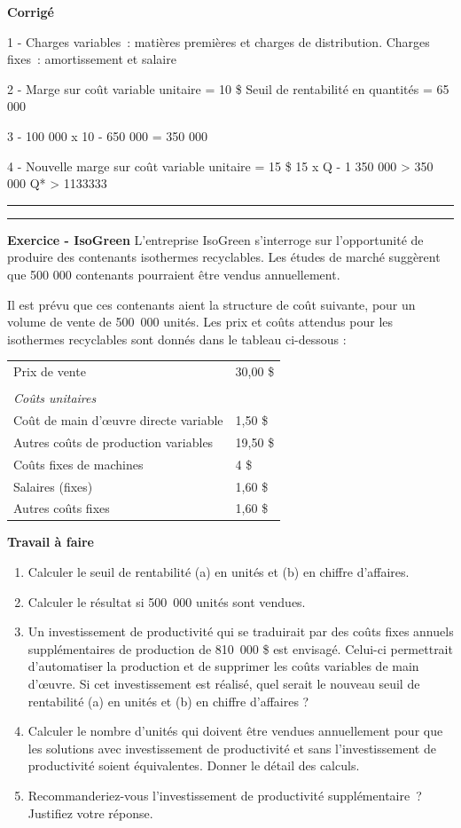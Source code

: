 \documentclass[oneside]{kaobook}
\begin{document}
\textbf{Corrigé}

1 - 
Charges variables : matières premières et charges de distribution.
Charges fixes : amortissement et salaire

2 - 
Marge sur coût variable unitaire = 10 \$
Seuil de rentabilité en quantités = 65 000

3 -
100 000 x 10 - 650 000 = 350 000

4 -
Nouvelle marge sur coût variable unitaire = 15 \$
15 x Q - 1 350 000 > 350 000
Q* > 1133333

\noindent\rule{\textwidth}{0.5pt}

\noindent\rule{\textwidth}{0.5pt}
\textbf{Exercice - IsoGreen}
L'entreprise IsoGreen s’interroge sur l’opportunité de produire des contenants isothermes recyclables. Les études de marché suggèrent que 500 000 contenants pourraient être vendus annuellement. 

Il est prévu que ces contenants aient la structure de coût suivante, pour un volume de vente de 500 000 unités. Les prix et coûts attendus pour les isothermes recyclables sont donnés dans le tableau ci-dessous :

\begin{center}
\begin{tabular}{ll}
Prix de vente & 30,00 \$\\
 & \\
\emph{Coûts unitaires} & \\
Coût de main d’œuvre directe variable & 1,50 \$\\
Autres coûts de production variables & 19,50 \$\\
Coûts fixes de machines & 4 \$\\
Salaires (fixes) & 1,60 \$\\
Autres coûts fixes & 1,60 \$\\
\end{tabular}
\end{center}

\textbf{Travail à faire}
\begin{enumerate}
\item Calculer le seuil de rentabilité (a) en unités et (b) en chiffre d’affaires.
\item Calculer le résultat si 500 000 unités sont vendues.
\item Un investissement de productivité qui se traduirait par des coûts fixes annuels supplémentaires de production de 810 000 \$ est envisagé. Celui-ci permettrait d’automatiser la production et de supprimer les coûts variables de main d’œuvre. Si cet investissement est réalisé, quel serait le nouveau seuil de rentabilité (a) en unités et (b) en chiffre d’affaires ?
\item Calculer le nombre d’unités qui doivent être vendues annuellement pour que les solutions avec investissement de productivité et sans l’investissement de productivité soient équivalentes. Donner le détail des calculs.
\item Recommanderiez-vous l’investissement de productivité supplémentaire ? Justifiez votre réponse.
\end{enumerate}
\end{document}
